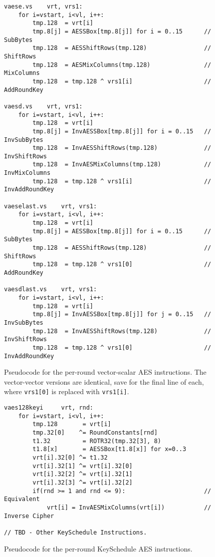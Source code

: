 \begin{figure}[h]
\begin{lstlisting}[language=pseudo]
vaese.vs    vrt, vrs1:
    for i=vstart, i<vl, i++:
        tmp.128  = vrt[i]
        tmp.8[j] = AESSBox[tmp.8[j]] for i = 0..15      // SubBytes
        tmp.128  = AESShiftRows(tmp.128)                // ShiftRows
        tmp.128  = AESMixColumns(tmp.128)               // MixColumns
        tmp.128  = tmp.128 ^ vrs1[i]                    // AddRoundKey

vaesd.vs    vrt, vrs1:
    for i=vstart, i<vl, i++:
        tmp.128  = vrt[i]
        tmp.8[j] = InvAESSBox[tmp.8[j]] for i = 0..15   // InvSubBytes
        tmp.128  = InvAESShiftRows(tmp.128)             // InvShiftRows
        tmp.128  = InvAESMixColumns(tmp.128)            // InvMixColumns
        tmp.128  = tmp.128 ^ vrs1[i]                    // InvAddRoundKey

vaeselast.vs    vrt, vrs1:
    for i=vstart, i<vl, i++:
        tmp.128  = vrt[i]
        tmp.8[j] = AESSBox[tmp.8[j]] for i = 0..15      // SubBytes
        tmp.128  = AESShiftRows(tmp.128)                // ShiftRows
        tmp.128  = tmp.128 ^ vrs1[0]                    // AddRoundKey

vaesdlast.vs    vrt, vrs1:
    for i=vstart, i<vl, i++:
        tmp.128  = vrt[i]
        tmp.8[j] = InvAESSBox[tmp.8[j]] for j = 0..15   // InvSubBytes
        tmp.128  = InvAESShiftRows(tmp.128)             // InvShiftRows
        tmp.128  = tmp.128 ^ vrs1[0]                    // InvAddRoundKey
\end{lstlisting}
\caption{Pseudocode for the per-round vector-scalar AES instructions.
The vector-vector versions are identical, save for the final
line of each, where {\tt vrs1[0]} is replaced with {\tt vrs1[i]}.}
\label{fig:pseudo:aes:vector:per-round}
\end{figure}

\begin{figure}[h]
\begin{lstlisting}[language=pseudo]
vaes128keyi     vrt, rnd:
    for i=vstart, i<vl, i++:
        tmp.128       = vrt[i]
        tmp.32[0]    ^= RoundConstants[rnd]
        t1.32         = ROTR32(tmp.32[3], 8)
        t1.8[x]       = AESSBox[t1.8[x]] for x=0..3
        vrt[i].32[0] ^= t1.32
        vrt[i].32[1] ^= vrt[i].32[0]
        vrt[i].32[2] ^= vrt[i].32[1]
        vrt[i].32[3] ^= vrt[i].32[2]
        if(rnd >= 1 and rnd <= 9):                      // Equivalent
            vrt[i] = InvAESMixColumns(vrt[i])           // Inverse Cipher
	
// TBD - Other KeySchedule Instructions.
\end{lstlisting}
\caption{Pseudocode for the per-round KeySchedule AES instructions.}
\label{fig:pseudo:aes:vector:per-round:ks}
\end{figure}


